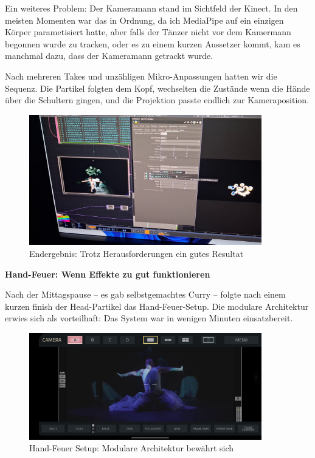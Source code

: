 Ein weiteres Problem: Der Kameramann stand im Sichtfeld der Kinect. In den meisten Momenten war das in Ordnung, da ich MediaPipe auf ein einzigen Körper parametisiert hatte, aber falls der Tänzer nicht vor dem Kamermann begonnen wurde zu tracken, oder es zu einem kurzen Aussetzer kommt, kam es manchmal dazu, dass der Kameramann getrackt wurde.

Nach mehreren Takes und unzähligen Mikro-Anpassungen hatten wir die Sequenz. Die Partikel folgten dem Kopf, wechselten die Zustände wenn die Hände über die Schultern gingen, und die Projektion passte endlich zur Kameraposition.

\begin{figure}[h]
   \centering
   \includegraphics[width=0.9\textwidth]{images/HeadtrackingBubblesClearlyAtHeadLevelOnBackgroundBeamerMediaPipeSkeletonBeautifullyVisible.png}
   \caption{Endergebnis: Trotz Herausforderungen ein gutes Resultat}
   \label{fig:head_result}
\end{figure}

\textbf{Hand-Feuer: Wenn Effekte zu gut funktionieren}

Nach der Mittagspause – es gab selbstgemachtes Curry – folgte nach einem kurzen finish der Head-Partikel das Hand-Feuer-Setup. Die modulare Architektur erwies sich als vorteilhaft: Das System war in wenigen Minuten einsatzbereit.

\begin{figure}[h]
   \centering
   \includegraphics[width=0.9\textwidth]{images/HQCinemaCameraPerspectiveOfHandFireToTheSidesOfTheHands.png}
   \caption{Hand-Feuer Setup: Modulare Architektur bewährt sich}
   \label{fig:hand_fire_setup}
\end{figure}

